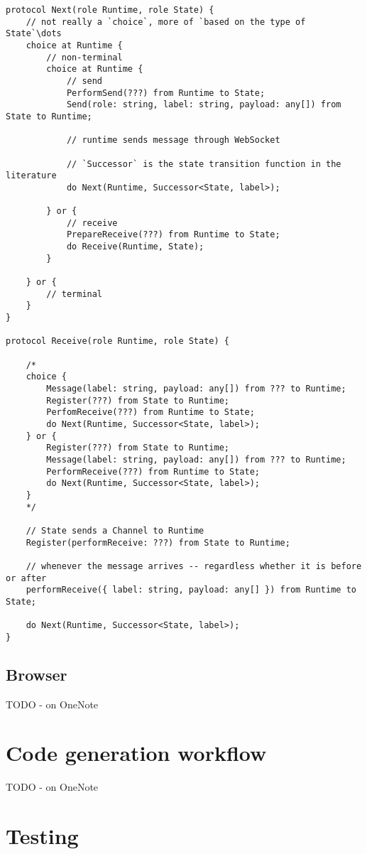 \documentclass{article}
\begin{document}
\begin{lstlisting}[breaklines=true, tabsize=4, frame=single]
protocol Next(role Runtime, role State) {
	// not really a `choice`, more of `based on the type of State`\dots
	choice at Runtime {
		// non-terminal
		choice at Runtime {
			// send
			PerformSend(???) from Runtime to State;
			Send(role: string, label: string, payload: any[]) from State to Runtime;
			
			// runtime sends message through WebSocket
			
			// `Successor` is the state transition function in the literature
			do Next(Runtime, Successor<State, label>);
			
		} or {
			// receive
			PrepareReceive(???) from Runtime to State;
			do Receive(Runtime, State);
		}
		
	} or {
		// terminal
	}
}

protocol Receive(role Runtime, role State) {
	
	/*
	choice {
		Message(label: string, payload: any[]) from ??? to Runtime;
		Register(???) from State to Runtime;
		PerfomReceive(???) from Runtime to State;
		do Next(Runtime, Successor<State, label>);
	} or {
		Register(???) from State to Runtime;
		Message(label: string, payload: any[]) from ??? to Runtime;
		PerformReceive(???) from Runtime to State;
		do Next(Runtime, Successor<State, label>); 
	}
	*/
	
	// State sends a Channel to Runtime
	Register(performReceive: ???) from State to Runtime;
	
	// whenever the message arrives -- regardless whether it is before or after
	performReceive({ label: string, payload: any[] }) from Runtime to State;
	
	do Next(Runtime, Successor<State, label>);
}
\end{lstlisting}

\subsection{Browser}

TODO - on OneNote

\section{Code generation workflow}

TODO - on OneNote

\section{Testing}
\end{document}
